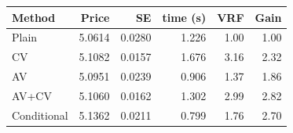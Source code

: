 \begin{tabular}{lrrrrr}
\toprule
Method & Price & SE & time (s) & VRF & Gain \\
\midrule
Plain & 5.0614 & 0.0280 & 1.226 & 1.00 & 1.00 \\
CV & 5.1082 & 0.0157 & 1.676 & 3.16 & 2.32 \\
AV & 5.0951 & 0.0239 & 0.906 & 1.37 & 1.86 \\
AV+CV & 5.1060 & 0.0162 & 1.302 & 2.99 & 2.82 \\
Conditional & 5.1362 & 0.0211 & 0.799 & 1.76 & 2.70 \\
\bottomrule
\end{tabular}
